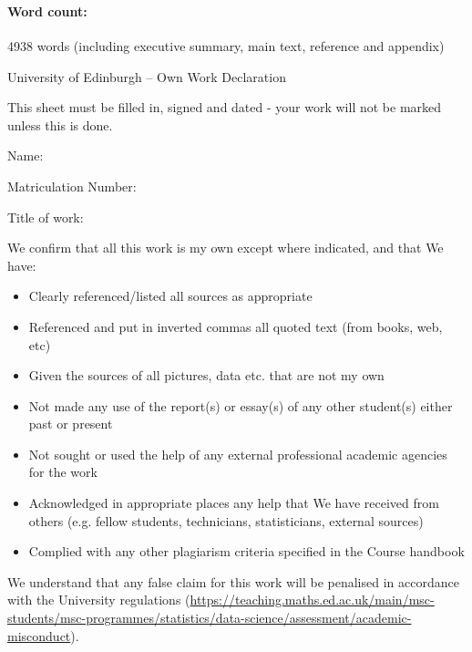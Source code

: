 \documentclass[11pt,twoside]{article}
\numberwithin{Theorem}{section}
\numberwithin{Definition}{section}
\numberwithin{Lemma}{section}
\numberwithin{Algorithm}{section}
\numberwithin{equation}{section}
\newcommand{\dottedline}[1]{\makebox[#1]{.\dotfill}}
\begin{document}
\ 

\ 

\paragraph{Word count:}

4938 words (including executive summary, main text,  reference and appendix)

\clearpage


\begin{center}
\Large{University of Edinburgh – Own Work Declaration}
\end{center}

This sheet must be filled in, signed and dated - your work will not be marked unless this is done.
\vspace{1cm}

Name: \dottedline{8cm}

Matriculation Number: \dottedline{6cm}

Title of work: \dottedline{8cm}

\vspace{1cm}

We confirm that all this work is my own except where indicated, and that We have:
\begin{itemize}
\item	Clearly referenced/listed all sources as appropriate	 				
\item	Referenced and put in inverted commas all quoted text (from books, web, etc)	
\item	Given the sources of all pictures, data etc. that are not my own				
\item	Not made any use of the report(s) or essay(s) of any other student(s) either past 	
or present	
\item	Not sought or used the help of any external professional academic agencies for the work
\item	Acknowledged in appropriate places any help that We have received from others	(e.g. fellow students, technicians, statisticians, external sources)
\item	Complied with any other plagiarism criteria specified in the Course handbook
\end{itemize}

We understand that any false claim for this work will be penalised in accordance with
the University regulations	(\url{https://teaching.maths.ed.ac.uk/main/msc-students/msc-programmes/statistics/data-science/assessment/academic-misconduct}).								
\end{document}
